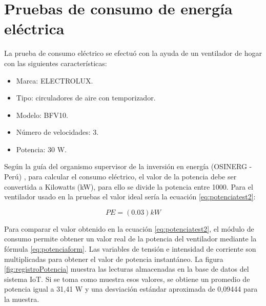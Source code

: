 \section{Pruebas de consumo de energía eléctrica}

La prueba de consumo eléctrico se efectuó con la ayuda de un ventilador de hogar con las siguientes características:

\begin{itemize}
\item Marca: ELECTROLUX.
\item Tipo:	circuladores de aire con temporizador.
\item Modelo: BFV10.
\item Número de velocidades: 3.
\item Potencia: 30 W.
\end{itemize}



Según la guía del organismo supervisor de la inversión en energía (OSINERG - Perú) \citep{BOOK:3}, para calcular el consumo eléctrico, el valor de la potencia  debe ser convertida a Kilowatts (kW), para ello se divide la potencia entre 1000. Para el ventilador usado en la pruebas el valor ideal sería la ecuación \ref{eq:potenciatest2}:

\begin{equation}
	\label{eq:potenciatest2}
	PE = \left( 0.03 \right) kW
\end{equation}

Para comparar el valor obtenido en la ecuación \ref{eq:potenciatest2}, el módulo de consumo permite obtener un valor real de la potencia del ventilador mediante la fórmula \ref{eq:potenciaform}. Las variables de tensión e intensidad de corriente son multiplicadas para obtener el valor de potencia instantáneo. La figura \ref{fig:registroPotencia} muestra las lecturas almacenadas en la base de datos del sistema IoT. Si se toma como muestra esos valores, se obtiene un promedio de potencia igual a 31,41 W y una desviación estándar aproximada de 0,09444 para la muestra.

